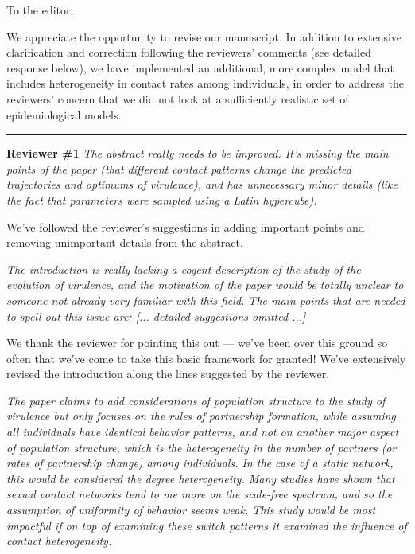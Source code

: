 \documentclass[10pt]{letter}
\newcommand{\revcomment}[1]{\emph{#1}}
\newcommand{\response}[1]{#1}
\begin{document}
\date{\today}

\signature{\texttt{[image: bbsig3.png]}\\Benjamin Bolker}

\begin{letter}{
} 

\opening{To the editor,}

We appreciate the opportunity to revise our manuscript.
In addition to extensive clarification and correction following
the reviewers' comments (see detailed response below), 
we have implemented an additional, more complex model
that includes heterogeneity in contact rates among individuals,
in order to address the reviewers' concern that we
did not look at a sufficiently realistic set of 
epidemiological models.

\vskip10pt
\hrule

\textbf{Reviewer \#1}
\revcomment{The abstract really needs to be improved. It’s missing the main points
of the paper (that different contact patterns change the predicted
trajectories and optimums of virulence), and has unnecessary minor
details (like the fact that parameters were sampled using a Latin
hypercube).}

\response{We've followed the reviewer's suggestions in adding
important points and removing unimportant details from the abstract.}

\revcomment{The introduction is really lacking a cogent description of the study of
the evolution of virulence, and the motivation of the paper would be
totally unclear to someone not already very familiar with this field.
The main points that are needed to spell out this issue are:
[... detailed suggestions omitted ...]
}

\response{We thank the reviewer for pointing this out --- we've 
been over this ground so often that we've come to take this basic
framework for granted!  We've  extensively revised the introduction
along the lines suggested by the reviewer.}

\revcomment{
The paper claims to add considerations of population structure to the
study of virulence but only focuses on the rules of partnership
formation, while assuming all individuals have identical behavior
patterns, and not on another major aspect of population structure, which
is the heterogeneity in the number of partners (or rates of partnership
change) among individuals. In the case of a static network, this would
be considered the degree heterogeneity. Many studies have shown that
sexual contact networks tend to me more on the scale-free spectrum, and
so the assumption of uniformity of behavior seems weak. This study would
be most impactful if on top of examining these switch patterns it
examined the influence of contact heterogeneity.}


\end{letter}
\end{document}
